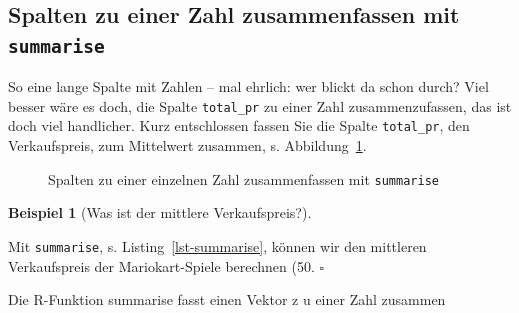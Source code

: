 \documentclass[
  letterpaper,
  oneside,
  open=any]{scrbook}
\newenvironment{Shaded}{\begin{snugshade}}{\end{snugshade}}
\newcommand{\AttributeTok}[1]{\textcolor[rgb]{0.40,0.45,0.13}{#1}}
\newcommand{\FunctionTok}[1]{\textcolor[rgb]{0.28,0.35,0.67}{#1}}
\newcommand{\NormalTok}[1]{\textcolor[rgb]{0.00,0.23,0.31}{#1}}
\newcommand{\OtherTok}[1]{\textcolor[rgb]{0.00,0.23,0.31}{#1}}
\theoremstyle{definition}
\theoremstyle{definition}
\newtheorem{example}{Beispiel}[chapter]
\theoremstyle{definition}
\theoremstyle{remark}
\begin{document}
\subsection{\texorpdfstring{Spalten zu einer Zahl zusammenfassen mit
\texttt{summarise}}{Spalten zu einer Zahl zusammenfassen mit summarise}}\label{spalten-zu-einer-zahl-zusammenfassen-mit-summarise}

So eine lange Spalte mit Zahlen -- mal ehrlich: wer blickt da schon
durch? Viel besser wäre es doch, die Spalte \texttt{total\_pr} zu einer
Zahl zusammenzufassen, das ist doch viel handlicher. Kurz entschlossen
fassen Sie die Spalte \texttt{total\_pr}, den Verkaufspreis, zum
Mittelwert zusammen, s. Abbildung~\ref{fig-summarise}.

\begin{figure}


\caption{\label{fig-summarise}Spalten zu einer einzelnen Zahl
zusammenfassen mit \texttt{summarise}}

\end{figure}%

\begin{example}[Was ist der mittlere
Verkaufspreis?]\protect\hypertarget{exm-summarise}{}\label{exm-summarise}

Mit \texttt{summarise}, s. Listing~\ref{lst-summarise}, können wir den
mittleren Verkaufspreis der Mariokart-Spiele berechnen (50. \(\square\)

\end{example}

\begin{codelisting}

\caption{\label{lst-summarise}Die R-Funktion summarise fasst einen
Vektor z u einer Zahl zusammen}

\centering{

\begin{Shaded}
\begin{Highlighting}[]
\NormalTok{mariokart\_mittelwert }\OtherTok{\textless{}{-}} \FunctionTok{summarise}\NormalTok{(mariokart,}
                                  \AttributeTok{preis\_mw =} \FunctionTok{mean}\NormalTok{(total\_pr))}
\NormalTok{mariokart\_mittelwert}
\end{Highlighting}
\end{Shaded}

}

\end{codelisting}%
\end{document}
